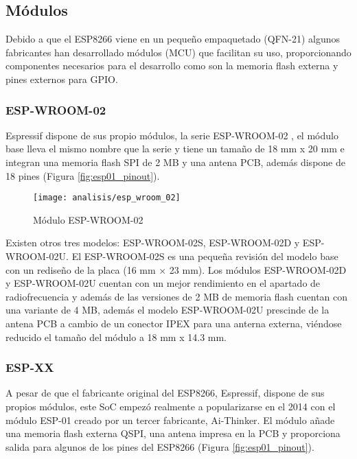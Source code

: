 \documentclass[../proyecto.tex]{subfiles}
\begin{document}
\subsection{Módulos}

Debido a que el ESP8266 viene en un pequeño empaquetado (QFN-21) algunos fabricantes han desarrollado módulos (MCU) que facilitan su uso, proporcionando componentes necesarios para el desarrollo como son la memoria flash externa y pines externos para GPIO.\\

\subsubsection{ESP-WROOM-02}

Espressif dispone de sus propio módulos, la serie ESP-WROOM-02 \cite{espwroom02_overview}, el módulo base \cite{espwroom02_datasheet} lleva el mismo nombre que la serie y tiene un tamaño de 18 mm x 20 mm e integran una memoria flash SPI de 2 MB y una antena PCB, además dispone de 18 pines (Figura \ref{fig:esp01_pinout}).\\

\begin{figure}[h]
\centering
\texttt{[image: analisis/esp\_wroom\_02]}
\caption{Módulo ESP-WROOM-02}
\label{fig:esp_wrom_02}
\end{figure}

Existen otros tres modelos: ESP-WROOM-02S, ESP-WROOM-02D y ESP-WROOM-02U. El ESP-WROOM-02S \cite{espwrooms2_datasheet} es una pequeña revisión del modelo base con un rediseño de la placa (16 mm × 23 mm). Los módulos ESP-WROOM-02D y ESP-WROOM-02U  \cite{espwroom02d_02u} cuentan con un mejor rendimiento en el apartado de radiofrecuencia y además de las versiones de 2 MB de memoria flash cuentan con una variante de 4 MB, además el modelo ESP-WROOM-02U prescinde de la antena PCB a cambio de un conector IPEX para una anterna externa, viéndose reducido el tamaño del módulo a 18 mm x 14.3 mm.\\

\subsubsection{ESP-XX}

A pesar de que el fabricante original del ESP8266, Espressif, dispone de sus propios módulos, este SoC empezó realmente a popularizarse en el 2014 con el módulo ESP-01 creado por un tercer fabricante, Ai-Thinker. El módulo añade una memoria flash externa QSPI, una antena impresa en la PCB y proporciona salida para algunos de los pines del ESP8266 (Figura \ref{fig:esp01_pinout}).\\
\end{document}
